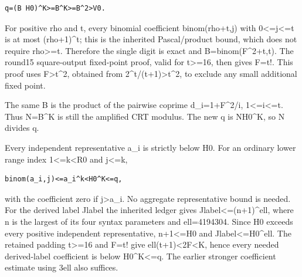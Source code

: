 \begin{verbatim}
q=(B H0)^K>=B^K>=B^2>V0.
\end{verbatim}

For positive rho and t, every binomial coefficient binom(rho+\allowbreak{}t,j) with 0\textless{}\allowbreak{}=\allowbreak{}j\textless{}\allowbreak{}=\allowbreak{}t is at most (rho+\allowbreak{}1)\textasciicircum{}\allowbreak{}t; this is the inherited Pascal/\allowbreak{}product bound, which does not require rho\textgreater{}\allowbreak{}=\allowbreak{}t. Therefore the single digit is exact and B=\allowbreak{}binom(F\textasciicircum{}\allowbreak{}2+\allowbreak{}t,t). The round15 square-output fixed-point proof, valid for t\textgreater{}\allowbreak{}=\allowbreak{}16, then gives F=\allowbreak{}t!. This proof uses F\textgreater{}\allowbreak{}t\textasciicircum{}\allowbreak{}2, obtained from 2\textasciicircum{}\allowbreak{}t/\allowbreak{}(t+\allowbreak{}1)\textgreater{}\allowbreak{}t\textasciicircum{}\allowbreak{}2, to exclude any small additional fixed point.



The same B is the product of the pairwise coprime d\_\allowbreak{}i=\allowbreak{}1+\allowbreak{}F\textasciicircum{}\allowbreak{}2/\allowbreak{}i, 1\textless{}\allowbreak{}=\allowbreak{}i\textless{}\allowbreak{}=\allowbreak{}t. Thus N=\allowbreak{}B\textasciicircum{}\allowbreak{}K is still the amplified CRT modulus. The new q is N\textasteriskcentered{}\allowbreak{}H0\textasciicircum{}\allowbreak{}K, so N divides q.



Every independent representative a\_\allowbreak{}i is strictly below H0. For an ordinary lower range index 1\textless{}\allowbreak{}=\allowbreak{}k\textless{}\allowbreak{}R0 and j\textless{}\allowbreak{}=\allowbreak{}k,



\begin{verbatim}
binom(a_i,j)<=a_i^k<H0^K<=q,
\end{verbatim}

with the coefficient zero if j\textgreater{}\allowbreak{}a\_\allowbreak{}i. No aggregate representative bound is needed. For the derived label Jlabel the inherited ledger gives Jlabel\textless{}\allowbreak{}=\allowbreak{}(n+\allowbreak{}1)\textasciicircum{}\allowbreak{}ell, where n is the largest of its four syntax parameters and ell=\allowbreak{}4194304. Since H0 exceeds every positive independent representative, n+\allowbreak{}1\textless{}\allowbreak{}=\allowbreak{}H0 and Jlabel\textless{}\allowbreak{}=\allowbreak{}H0\textasciicircum{}\allowbreak{}ell. The retained padding t\textgreater{}\allowbreak{}=\allowbreak{}16 and F=\allowbreak{}t! give ell(t+\allowbreak{}1)\textless{}\allowbreak{}2F\textless{}\allowbreak{}K, hence every needed derived-label coefficient is below H0\textasciicircum{}\allowbreak{}K\textless{}\allowbreak{}=\allowbreak{}q. The earlier stronger coefficient estimate using 3ell also suffices.



